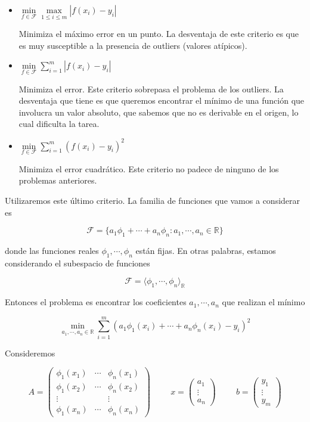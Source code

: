 \begin{itemize}
\item $\min\limits_{f \in \mathcal{F}}\max\limits_{1 \leq i \leq m} |f(x_i) - y_i|$

Minimiza el máximo error en un punto. La desventaja de este criterio es que es muy susceptible a la presencia de outliers (valores atípicos).

\item $\min\limits_{f \in \mathcal{F}} \sum_{i = 1}^m |f(x_i) - y_i|$

Minimiza el error. Este criterio sobrepasa el problema de los outliers. La desventaja que tiene es que queremos encontrar el mínimo de una función que involucra un valor absoluto, que sabemos que no es derivable en el origen, lo cual dificulta la tarea.

\item $\min\limits_{f \in \mathcal{F}} \sum_{i = 1}^m (f(x_i) - y_i)^2$

Minimiza el error cuadrático. Este criterio no padece de ninguno de los problemas anteriores.
\end{itemize}

Utilizaremos este último criterio. La familia de funciones que vamos a considerar es

\[\mathcal{F} = \{a_1 \phi_1 + \cdots + a_n \phi_n : a_1, \cdots, a_n \in \mathbb{R}\}\]

donde las funciones reales $\phi_1, \cdots, \phi_n$ están fijas. En otras palabras, estamos considerando el subespacio de funciones

\[\mathcal{F} = \langle\phi_1, \cdots, \phi_n\rangle_{\mathbb{R}}\]

Entonces el problema es encontrar los coeficientes $a_1, \cdots, a_n$ que realizan el mínimo

\[\min\limits_{a_1, \cdots, a_n \in \mathbb{R}} \sum_{i = 1}^m (a_1 \phi_1(x_i) + \cdots + a_n \phi_n(x_i) - y_i)^2\]

Consideremos

\[A = \begin{pmatrix}
\phi_1(x_1) & \cdots & \phi_n(x_1) \\
\phi_1(x_2) & \cdots & \phi_n(x_2) \\
\vdots		&		&	\vdots		\\
\phi_1(x_n)	& \cdots & \phi_n(x_n)
\end{pmatrix} 
\hspace{1cm}
x = \begin{pmatrix}
a_1 \\
\vdots \\
a_n
\end{pmatrix}
\hspace{1cm}
b = \begin{pmatrix}
y_1\\
\vdots\\
y_m
\end{pmatrix}
\]

